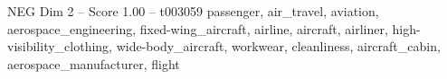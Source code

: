 \begin{textsample}{NEG Dim 2 – Score 1.00 – t003059}  \label{ex:f2_neg_015}
passenger, air\_travel, aviation, aerospace\_engineering, fixed-wing\_aircraft, airline, aircraft, airliner, high-visibility\_clothing, wide-body\_aircraft, workwear, cleanliness, aircraft\_cabin, aerospace\_manufacturer, flight

\end{textsample}
